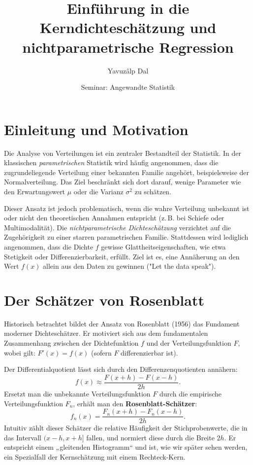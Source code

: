 \documentclass[a4paper,12pt]{article}
\title{Einführung in die Kerndichteschätzung und nichtparametrische Regression}
\author{Yavuzâlp Dal}
\date{Seminar: Angewandte Statistik}
\begin{document}
\maketitle
\tableofcontents
\newpage

\section{Einleitung und Motivation}
Die Analyse von Verteilungen ist ein zentraler Bestandteil der Statistik. In der klassischen \textit{parametrischen} Statistik wird häufig angenommen, dass die zugrundeliegende Verteilung einer bekannten Familie angehört, beispielsweise der Normalverteilung. Das Ziel beschränkt sich dort darauf, wenige Parameter wie den Erwartungswert $\mu$ oder die Varianz $\sigma^2$ zu schätzen.

Dieser Ansatz ist jedoch problematisch, wenn die wahre Verteilung unbekannt ist oder nicht den theoretischen Annahmen entspricht (z.\,B. bei Schiefe oder Multimodalität). Die \textit{nichtparametrische Dichteschätzung} verzichtet auf die Zugehörigkeit zu einer starren parametrischen Familie. Stattdessen wird lediglich angenommen, dass die Dichte $f$ gewisse Glattheitseigenschaften, wie etwa Stetigkeit oder Differenzierbarkeit, erfüllt. Ziel ist es, eine Annäherung an den Wert $f(x)$ allein aus den Daten zu gewinnen ("Let the data speak").

\section{Der Schätzer von Rosenblatt}
Historisch betrachtet bildet der Ansatz von Rosenblatt (1956) das Fundament moderner Dichteschätzer. Er motiviert sich aus dem fundamentalen Zusammenhang zwischen der Dichtefunktion $f$ und der Verteilungsfunktion $F$, wobei gilt: $F'(x) = f(x)$ (sofern $F$ differenzierbar ist).

Der Differentialquotient lässt sich durch den Differenzenquotienten annähern:
\begin{equation}
    f(x) \approx \frac{F(x+h) - F(x-h)}{2h}.
\end{equation}
Ersetzt man die unbekannte Verteilungsfunktion $F$ durch die empirische Verteilungsfunktion $F_n$, erhält man den \textbf{Rosenblatt-Schätzer}:
\begin{equation}
    f_n(x) = \frac{F_n(x+h) - F_n(x-h)}{2h}.
\end{equation}
Intuitiv zählt dieser Schätzer die relative Häufigkeit der Stichprobenwerte, die in das Intervall $(x-h, x+h]$ fallen, und normiert diese durch die Breite $2h$. Er entspricht einem „gleitenden Histogramm“ und ist, wie wir später sehen werden, ein Spezialfall der Kernschätzung mit einem Rechteck-Kern.
\end{document}
